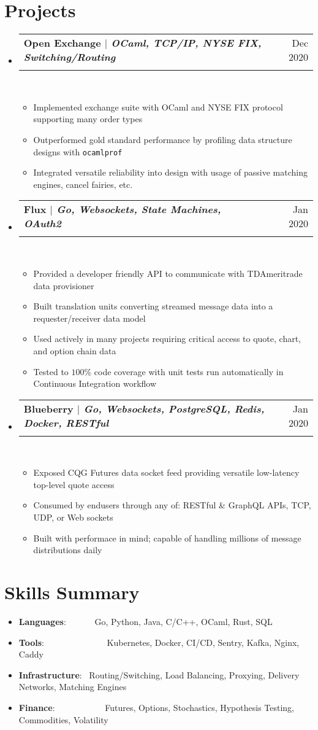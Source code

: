 \documentclass[a4paper,12pt]{extarticle}
\makeatletter
\newcommand{\resumeSkillItem}[2]{
	\item\small{
		\textbf{#1}{: #2 \vspace{-2pt}}
	}
}
\newcommand{\resumeItem}[1]{
	\item\small{
		#1 \vspace{-2pt}
	}
}
\newcommand{\resumeSubheading}[4]{
	\vspace{-1pt}\item
		\begin{tabular*}{0.97\textwidth}{l@{\extracolsep{\fill}}r}
			\textbf{#1} & #2 \\
			\textit{#3} & \textit{#4} \\
		\end{tabular*}\vspace{-5pt}
}
\newcommand{\resumeSubItem}[2]{\resumeSkillItem{#1}{#2}\vspace{-5pt}}
\newcommand{\resumeSubHeadingListStart}{\begin{itemize}[leftmargin=0.15in,label={}]}
\newcommand{\resumeSubHeadingListEnd}{\end{itemize}}
\newcommand{\resumeItemListStart}{\begin{itemize}\vspace{-3pt}}
\newcommand{\resumeItemListEnd}{\end{itemize}\vspace{-5pt}}
\makeatother
\begin{document}
\section{Projects}
	\resumeSubHeadingListStart
		\resumeSubheading{Open Exchange $|$ 
		{\normalfont \small \textit 
		{OCaml, TCP/IP, NYSE FIX, Switching/Routing}}}
		{Dec 2020}{}{}\\[-10pt]
		\resumeItemListStart
			\resumeItem{Implemented exchange suite with OCaml and NYSE
				FIX protocol supporting many order types}
			\resumeItem{Outperformed gold standard performance by profiling
				data structure designs with \texttt{ocamlprof}}
			\resumeItem{Integrated versatile reliability into design with 
				usage of passive matching engines, cancel fairies, etc.}
		\resumeItemListEnd
		\resumeSubheading{Flux $|$ 
		{\normalfont \small \textit 
		{Go, Websockets, State Machines, OAuth2}}}
		{Jan 2020}{}{}\\[-10pt]
		\resumeItemListStart
			\resumeItem{Provided a developer friendly API to communicate with
				TDAmeritrade data provisioner}
			\resumeItem{Built translation units converting streamed message
				data into a requester/receiver data model}
			\resumeItem{Used actively in many projects requiring critical
				access to quote, chart, and option chain data}
			\resumeItem{Tested to $100$\% code coverage with unit tests 
				run automatically in Continuous Integration workflow}
		\resumeItemListEnd
		\resumeSubheading{Blueberry $|$ 
		{\normalfont \small \textit 
		{Go, Websockets, PostgreSQL, Redis, Docker, RESTful}}}
		{Jan 2020}{}{}\\[-10pt]
		\resumeItemListStart
			\resumeItem{Exposed CQG Futures data socket 
			feed providing versatile low-latency top-level quote access}
			\resumeItem{Consumed by endusers through any of:
			RESTful \& GraphQL APIs, TCP, UDP, or Web sockets}
			\resumeItem{Built with performace in mind; capable of handling
			millions of message distributions daily}
		\resumeItemListEnd
	\resumeSubHeadingListEnd
\vspace{-5mm}
\section{Skills Summary}
	\resumeSubHeadingListStart
		\resumeSubItem{Languages}
			{~~~~~~Go, Python, Java, C/C++, OCaml, Rust, SQL}
		\resumeSubItem{Tools}
			{~~~~~~~~~~~~~~Kubernetes, Docker, CI/CD, Sentry, Kafka, Nginx,
			Caddy}
		\resumeSubItem{Infrastructure}
			{~Routing/Switching, Load Balancing, Proxying, Delivery Networks,
			 Matching Engines}
		\resumeSubItem{Finance}
			{~~~~~~~~~~~Futures, Options, Stochastics, Hypothesis Testing,
			Commodities, Volatility}
	\resumeSubHeadingListEnd
\end{document}
